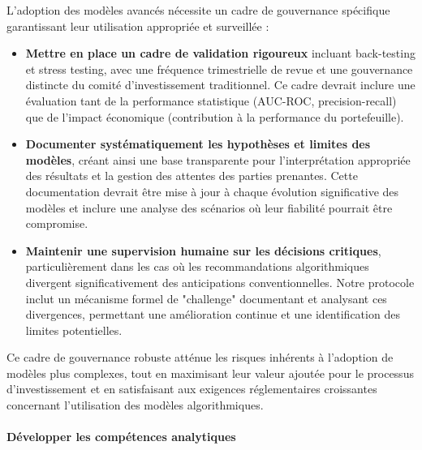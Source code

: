 L'adoption des modèles avancés nécessite un cadre de gouvernance spécifique garantissant leur utilisation appropriée et surveillée :
\begin{itemize}
    \item \textbf{Mettre en place un cadre de validation rigoureux} incluant back-testing et stress testing, avec une fréquence trimestrielle de revue et une gouvernance distincte du comité d'investissement traditionnel. Ce cadre devrait inclure une évaluation tant de la performance statistique (AUC-ROC, precision-recall) que de l'impact économique (contribution à la performance du portefeuille).
    
    \item \textbf{Documenter systématiquement les hypothèses et limites des modèles}, créant ainsi une base transparente pour l'interprétation appropriée des résultats et la gestion des attentes des parties prenantes. Cette documentation devrait être mise à jour à chaque évolution significative des modèles et inclure une analyse des scénarios où leur fiabilité pourrait être compromise.
    
    \item \textbf{Maintenir une supervision humaine sur les décisions critiques}, particulièrement dans les cas où les recommandations algorithmiques divergent significativement des anticipations conventionnelles. Notre protocole inclut un mécanisme formel de "challenge" documentant et analysant ces divergences, permettant une amélioration continue et une identification des limites potentielles.
\end{itemize}

Ce cadre de gouvernance robuste atténue les risques inhérents à l'adoption de modèles plus complexes, tout en maximisant leur valeur ajoutée pour le processus d'investissement et en satisfaisant aux exigences réglementaires croissantes concernant l'utilisation des modèles algorithmiques.

\paragraph{Développer les compétences analytiques}

